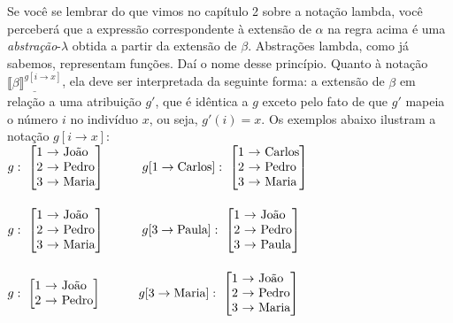 \n Se você se lembrar do que vimos no capítulo 2 sobre a notação lambda, você perceberá que a expressão correspondente à extensão de $\alpha$ na regra acima é uma \textit{abstração}-$\lambda$ obtida a partir da extensão de $\beta$. Abstrações lambda, como já sabemos, representam funções. Daí o nome desse princípio. Quanto à notação $\underline{\llbracket \beta \rrbracket^{g[i
\rightarrow x]}}$, ela deve ser interpretada da seguinte forma: a
extensão de $\beta $ em relação a uma atribuição $g'$,
que é idêntica a $g$ exceto pelo fato de que $g'$
mapeia o número $i$ no indivíduo $x$, ou seja, $g'(i)=x$. Os exemplos
abaixo ilustram a notação $g[{i \rightarrow x}]$:\\

$g:\ \left[%
\begin{array}{@{}c@{\ }l@{\ }l@{}}%
1 & \rightarrow& \text{João} \\
2 & \rightarrow & \text{Pedro} \\
3 & \rightarrow & \text{Maria} \\
\end{array}\right]$\ \ \ \ \ \ $g[1\rightarrow \text{Carlos}]:\ \left[%
\begin{array}{@{}c@{\ }l@{\ }l@{}}%
1 & \rightarrow& \text{Carlos} \\
2 & \rightarrow & \text{Pedro} \\
3 & \rightarrow & \text{Maria} \\
\end{array}\right]$\\\\

$g:\ \left[%
\begin{array}{@{}c@{\ }l@{\ }l@{}}%
1 & \rightarrow& \text{João} \\
2 & \rightarrow & \text{Pedro} \\
3 & \rightarrow & \text{Maria} \\
\end{array}\right]$\ \ \ \ \ \ $g[3 \rightarrow \text{Paula}]:\ \left[%
\begin{array}{@{}c@{\ }l@{\ }l@{}}%
1 & \rightarrow& \text{João} \\
2 & \rightarrow & \text{Pedro} \\
3 & \rightarrow & \text{Paula} \\
\end{array}\right]$\\\\

$g:\ \left[%
\begin{array}{@{}c@{\ }l@{\ }l@{}}%
1 & \rightarrow& \text{João} \\
2 & \rightarrow & \text{Pedro} \\
\end{array}\right]$\ \ \ \ \ \ $g[3 \rightarrow \text{Maria}]:\ \left[%
\begin{array}{@{}c@{\ }l@{\ }l@{}}%
1 & \rightarrow& \text{João} \\
2 & \rightarrow & \text{Pedro} \\
3 & \rightarrow & \text{Maria} \\
\end{array}\right]$\\\\

